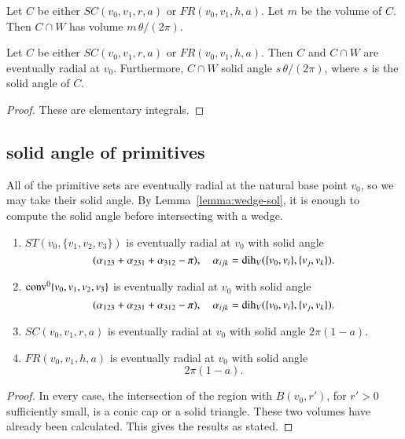 \begin{lemma}  Let $C$ be either $SC(v_0,v_1,r,a)$ or
   $FR(v_0,v_1,h,a)$.  Let $m$ be the volume of $C$.  
   Then $C\cap W$ has volume $m\,\theta/(2\pi)$.   
\end{lemma}

\begin{lemma}  Let $C$ be either $SC(v_0,v_1,r,a)$ or
   $FR(v_0,v_1,h,a)$.  Then $C$ and $C\cap W$ are eventually 
radial at $v_0$. Furthermore,
    $C\cap W$ solid angle 
  $s\,\theta/(2\pi)$, where $s$ is the solid angle of $C$.
\end{lemma}


\begin{proof}
These are elementary integrals.
\end{proof}


\subsection{solid angle of primitives}

All of the primitive sets are eventually radial at the natural
base point $v_0$, so we may take their
solid angle.  By Lemma~\ref{lemma:wedge-sol}, it is enough to compute
the solid angle before intersecting with a wedge.

\begin{lemma} 
\begin{enumerate}
    \item  $ST(v_0,\{v_1,v_2,v_3\})$ is eventually radial at $v_0$
     with solid angle 
     $$
     (\alpha_{123}+\alpha_{231}+\alpha_{312}-\pi),\quad
     \alpha_{ijk}=\operatorname{dih}_V(\{v_0,v_i\},\{v_j,v_k\}).
     $$
    \item ${\operatorname{conv}}^0\{v_0,v_1,v_2,v_3\}$ is eventually radial at $v_0$
      with solid angle
           $$
     (\alpha_{123}+\alpha_{231}+\alpha_{312}-\pi),\quad
     \alpha_{ijk}=\operatorname{dih}_V(\{v_0,v_i\},\{v_j,v_k\}).
     $$
    \item $SC(v_0,v_1,r,a)$ is eventually radial at $v_0$ with solid
      angle 
      $2\pi(1-a)$.
    \item $FR(v_0,v_1,h,a)$ is eventually radial at $v_0$ with solid
      angle
        $$
        2\pi (1-a).
        $$
\end{enumerate}
\end{lemma}

\begin{proof} In every case, the intersection of 
  the region with $B(v_0,r')$, for $r'>0$ sufficiently small, is
  a conic cap or a solid triangle.  These two volumes have
  already been calculated.  This gives the results as stated.
\end{proof}

